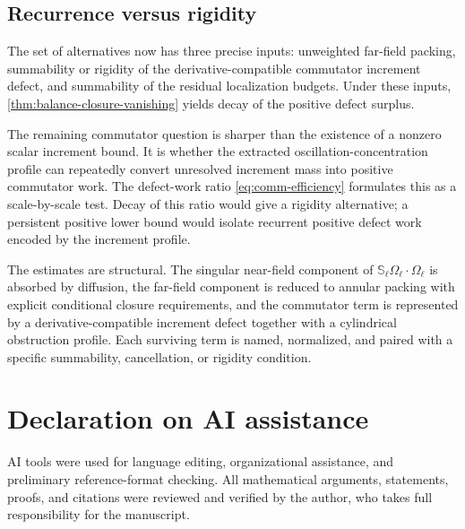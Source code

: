 \documentclass[11pt]{article}
\numberwithin{equation}{section}
\theoremstyle{plain}
\theoremstyle{definition}
\theoremstyle{remark}
\begin{document}
\subsection{Recurrence versus rigidity}

The set of alternatives now has three precise inputs: unweighted far-field packing, summability or rigidity of the derivative-compatible commutator increment defect, and summability of the residual localization budgets.  Under these inputs, \cref{thm:balance-closure-vanishing} yields decay of the positive defect surplus.

The remaining commutator question is sharper than the existence of a nonzero scalar increment bound.  It is whether the extracted oscillation-concentration profile can repeatedly convert unresolved increment mass into positive commutator work.  The defect-work ratio \eqref{eq:comm-efficiency} formulates this as a scale-by-scale test.  Decay of this ratio would give a rigidity alternative; a persistent positive lower bound would isolate recurrent positive defect work encoded by the increment profile.

The estimates are structural. The singular near-field component of $\mathbb S_\ell\Omega_\ell\cdot\Omega_\ell$ is absorbed by diffusion, the far-field component is reduced to annular packing with explicit conditional closure requirements, and the commutator term is represented by a derivative-compatible increment defect together with a cylindrical obstruction profile.  Each surviving term is named, normalized, and paired with a specific summability, cancellation, or rigidity condition.


\section*{Declaration on AI assistance}
AI tools were used for language editing, organizational assistance, and preliminary reference-format checking.  All mathematical arguments, statements, proofs, and citations were reviewed and verified by the author, who takes full responsibility for the manuscript.
\end{document}
